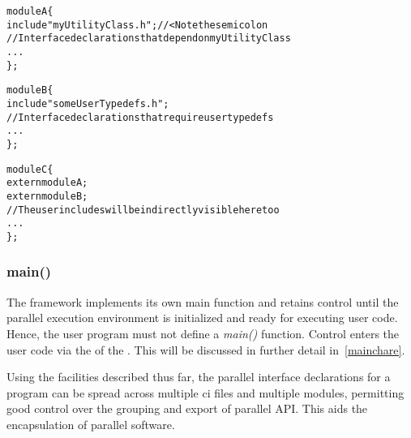 \begin{alltt}
module A \{
    include "myUtilityClass.h"; //< Note the semicolon
    // Interface declarations that depend on myUtilityClass
    ...
\};

module B \{
    include "someUserTypedefs.h";
    // Interface declarations that require user typedefs
    ...
\};

module C \{
    extern module A;
    extern module B;
    // The user includes will be indirectly visible here too
    ...
\};
\end{alltt}


\subsubsection{main()}

The \charmpp framework implements its own main\(\) function and retains control
until the parallel execution environment is initialized and ready for executing
user code. Hence, the user program must not define a \emph{main()} function.
Control enters the user code via the  of the .
This will be discussed in further detail in~\ref{mainchare}.

Using the facilities described thus far, the parallel interface declarations
for a \charm program can be spread across multiple ci files and multiple
modules, permitting good control over the grouping and export of parallel API.
This aids the encapsulation of parallel software.

